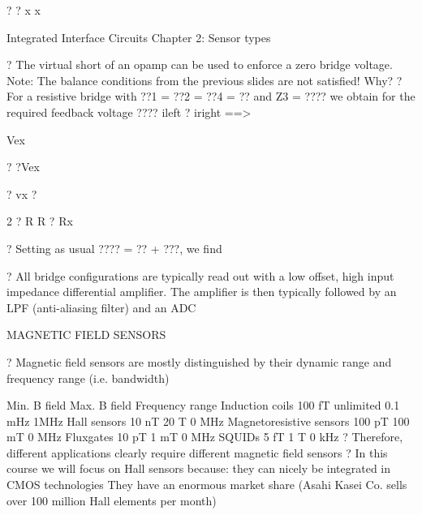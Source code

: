 \documentclass[2pt,landscape]{article}
\begin{document}
\begin{multicols*}{5}
?	?	x	x




Integrated Interface Circuits \textbullet Chapter 2: Sensor types



?	The virtual short of an opamp can be used to enforce a zero bridge 
voltage. Note: The balance conditions from the previous slides are not 
satisfied! Why?
?	For a resistive bridge with ??1 = ??2 = ??4 = ?? and Z3 = ????
we obtain for the required feedback
voltage ????
ileft ? iright ==>


Vex


? ?Vex


?	vx ?


2 ? R	R ? Rx

?	Setting as usual ???? = ?? + ???, we find




?	All bridge configurations are typically read out with a low offset, high 
input impedance differential amplifier. The amplifier is then typically 
followed by an LPF (anti-aliasing filter) and an ADC






























MAGNETIC FIELD SENSORS



?	Magnetic field sensors are mostly distinguished by their dynamic range 
and frequency range (i.e. bandwidth)


Min. B field
Max. B field
Frequency range
Induction coils
100 fT
unlimited
0.1 mHz \textbullet 1MHz
Hall sensors
10 nT
20 T
0  MHz
Magnetoresistive 
sensors
100 pT
100 mT
0  MHz
Fluxgates
10 pT
1 mT
0  MHz
SQUIDs
5 fT
1 \textbullet T
0  kHz
?	Therefore, different applications clearly require different magnetic field 
sensors
?	In this course we will focus on Hall sensors because:
\textbullet 	they can nicely be integrated in CMOS technologies
\textbullet 	They have an enormous market share (Asahi Kasei Co. sells over 100 
million Hall elements per month)




\end{multicols*}
\end{document}
